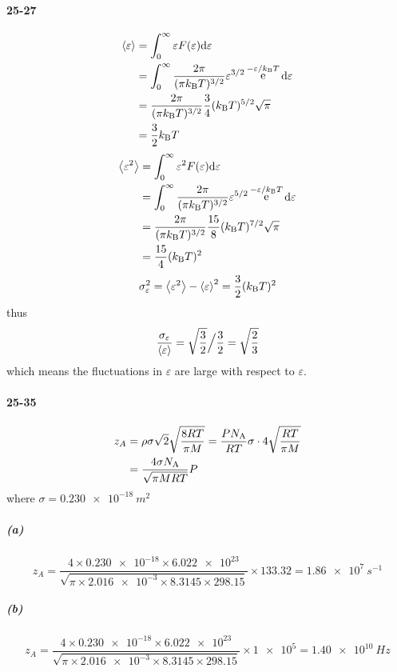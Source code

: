\documentclass[a4paper]{article}
\DeclareMathOperator{\intinf}{\int_0^\infty}
\DeclareMathOperator{\e}{\mathrm{e}}
\newcommand{\NA}{N_\mathrm{A}}
\newcommand{\kB}{k_\mathrm{B}}
\newcommand{\ex}[1]{\paragraph{#1}}
\newcommand{\subex}[1]{\subparagraph{#1}}
\numberwithin{equation}{section}
\begin{document}
\ex{25-27}
\begin{align}
\ev{\varepsilon} &= \intinf \varepsilon F(\varepsilon)\dd\varepsilon \notag\\
&= \intinf \dfrac{2\pi}{(\pi \kB T)^{3/2}} \varepsilon^{3/2}\e^{-\varepsilon/\kB T}\dd\varepsilon \notag\\
&= \dfrac{2\pi}{(\pi \kB T)^{3/2}} \dfrac{3}{4}(\kB T)^{5/2}\sqrt{\pi} \notag\\
&= \dfrac{3}{2}\kB T
\end{align}
\begin{align}
\ev{\varepsilon^2} &= \intinf \varepsilon^2 F(\varepsilon)\dd\varepsilon \notag\\
&= \intinf \dfrac{2\pi}{(\pi \kB T)^{3/2}} \varepsilon^{5/2}\e^{-\varepsilon/\kB T}\dd\varepsilon \notag\\
&= \dfrac{2\pi}{(\pi \kB T)^{3/2}} \dfrac{15}{8}(\kB T)^{7/2}\sqrt{\pi} \notag\\
&=  \dfrac{15}{4}(\kB T)^2
\end{align}
\begin{equation}\label{key}
\sigma_\varepsilon^2 = \ev{\varepsilon^2} - \ev{\varepsilon}^2 = \dfrac{3}{2}(\kB T)^2
\end{equation}
thus
\begin{equation}\label{key}
\dfrac{\sigma_\varepsilon}{\ev{\varepsilon}} = \sqrt{\dfrac{3}{2}}{\Big /}\dfrac{3}{2} = \sqrt{\dfrac{2}{3}}
\end{equation}
which means the fluctuations in $ \varepsilon $ are large with respect to $ \varepsilon $.

\ex{25-35}
\begin{align}\label{key}
z_A &= \rho\sigma\sqrt{2}\sqrt{\dfrac{8RT}{\pi M}} = \dfrac{P \NA}{R T}\sigma \cdot 4\sqrt{\dfrac{RT}{\pi M}} \notag\\
&= \dfrac{4\sigma \NA}{\sqrt{\pi M RT}}P 
\end{align}
where $ \sigma = \SI{0.230e-18}{m^2} $
\subex{(a)}
\begin{equation}\label{key}
z_A = \dfrac{4\times\num{0.230e-18} \times \num{6.022e23}}{\sqrt{\pi\times \num{2.016e-3} \times\num{8.3145}\times 298.15}}\times 133.32 = \SI{1.86e7}{s^{-1}}
\end{equation}
\subex{(b)}
\begin{equation}\label{key}
z_A = \dfrac{4\times\num{0.230e-18} \times \num{6.022e23}}{\sqrt{\pi\times \num{2.016e-3} \times\num{8.3145}\times 298.15}}\times \num{1e5} = \SI{1.40e10}{Hz}
\end{equation}
\end{document}
